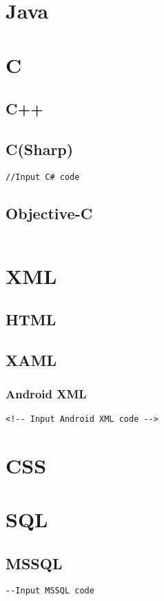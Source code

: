 


%







\newpage
\section{Java}
\newpage
\section{C}
\newpage
\subsection{C++}
\newpage
\subsection{C(Sharp)}
\begin{lstlisting}[style = CSharp]
//Input C# code
\end{lstlisting}
\newpage
\subsection{Objective-C}
\begin{lstlisting}

\end{lstlisting}
\newpage
\section{XML}
\newpage
\subsection{HTML}
\newpage
\subsection{XAML}
\newpage
\subsubsection{Android XML}
\begin{lstlisting}[style = AndroidXML]
<!-- Input Android XML code -->
\end{lstlisting}
\newpage
\section{CSS}
\newpage
\section{SQL}
\subsection{MSSQL}
\begin{lstlisting}[style = MSSQL]
--Input MSSQL code
\end{lstlisting}
